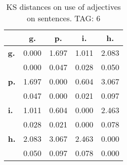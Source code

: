\begin{table}[h!]
\begin{center}
\begin{tabular}{| l || c | c | c | c |}\hline
 & {\bf g.} & {\bf p.} & {\bf i.} & {\bf h.} \\\hline\hline
{\bf g.} & 0.000 & 1.697 & 1.011 & 2.083 \\
{\bf } & 0.000 & 0.047 & 0.028 & 0.050 \\\hline
{\bf p.} & 1.697 & 0.000 & 0.604 & 3.067 \\
{\bf } & 0.047 & 0.000 & 0.021 & 0.097 \\\hline
{\bf i.} & 1.011 & 0.604 & 0.000 & 2.463 \\
{\bf } & 0.028 & 0.021 & 0.000 & 0.078 \\\hline
{\bf h.} & 2.083 & 3.067 & 2.463 & 0.000 \\
{\bf } & 0.050 & 0.097 & 0.078 & 0.000 \\\hline
\end{tabular}
\caption{KS distances on use of adjectives on sentences. TAG: 6}
\end{center}
\end{table}